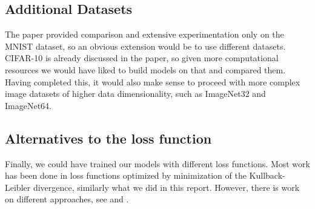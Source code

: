 
\subsection{Additional Datasets}
The paper provided comparison and extensive experimentation only on the MNIST dataset, so an obvious extension would be to use different datasets. CIFAR-10 is already discussed in the paper, so given more computational resources we would have liked to build models on that and compared them. Having completed this, it would also make sense to proceed with more complex image datasets of higher data dimensionality,  such as ImageNet32 and ImageNet64.


\subsection{Alternatives to the loss function}
Finally, we could have trained our models with different loss functions. Most work has been done in loss functions optimized by minimization of the Kullback-Leibler divergence, similarly what we did in this report. However, there is work on different approaches, see \cite{flow_gan} and \cite{wass}.